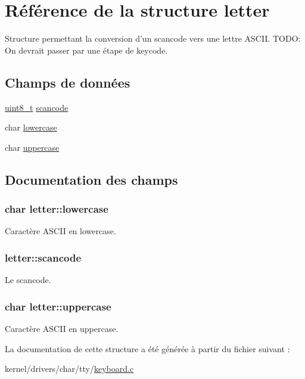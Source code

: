 \hypertarget{structletter}{\section{\-Référence de la structure letter}
\label{structletter}
}


\-Structure permettant la conversion d'un scancode vers une lettre \-A\-S\-C\-I\-I. \-T\-O\-D\-O\-: \-On devrait passer par une étape de keycode.  


\subsection*{\-Champs de données}
\begin{DoxyCompactItemize}
\item 
\hyperlink{types_8h_aba7bc1797add20fe3efdf37ced1182c5}{uint8\-\_\-t} \hyperlink{structletter_a81ce8d7b41dfa934b919f660bea2b52b}{scancode}
\item 
char \hyperlink{structletter_af4289f944a89553b8145286331ca3bdd}{lowercase}
\item 
char \hyperlink{structletter_abcf4b11624e2497e2d5798a805002268}{uppercase}
\end{DoxyCompactItemize}


\subsection{\-Documentation des champs}
\hypertarget{structletter_af4289f944a89553b8145286331ca3bdd}{
\subsubsection[{lowercase}]{\setlength{\rightskip}{0pt plus 5cm}char {\bf letter\-::lowercase}}}\label{structletter_af4289f944a89553b8145286331ca3bdd}
\-Caractère \-A\-S\-C\-I\-I en lowercase. \hypertarget{structletter_a81ce8d7b41dfa934b919f660bea2b52b}{
\subsubsection[{scancode}]{ {\bf letter\-::scancode}}}\label{structletter_a81ce8d7b41dfa934b919f660bea2b52b}
\-Le scancode. \hypertarget{structletter_abcf4b11624e2497e2d5798a805002268}{
\subsubsection[{uppercase}]{\setlength{\rightskip}{0pt plus 5cm}char {\bf letter\-::uppercase}}}\label{structletter_abcf4b11624e2497e2d5798a805002268}
\-Caractère \-A\-S\-C\-I\-I en uppercase. 

\-La documentation de cette structure a été générée à partir du fichier suivant \-:\begin{DoxyCompactItemize}
\item 
kernel/drivers/char/tty/\hyperlink{keyboard_8c}{keyboard.\-c}\end{DoxyCompactItemize}
